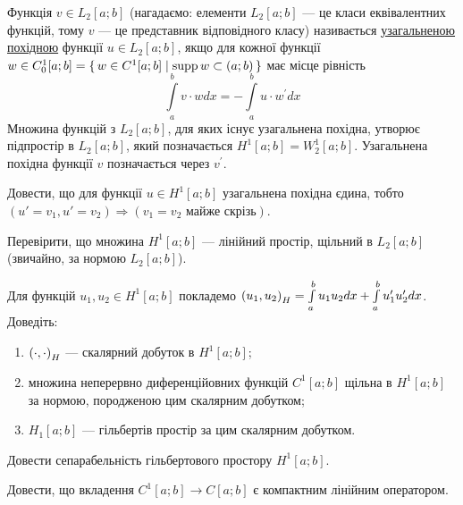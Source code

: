 
\begin{theory}
    Функція $v \in L_2[a;b]$ (нагадаємо: елементи
    $L_2[a;b]$ --- це класи еквівалентних функцій, тому
    $v$ --- це представник відповідного класу) називається
    \uline{узагальненою похідною} функції $u \in L_2[a;b]$,
    якщо для кожної функції $w \in C_0^1 [a;b] = \set{w \in C^1[a;b] \mid \operatorname{supp}{w} \subset (a; b)}$
    має місце рівність $$\int\limits_a^b v \cdot w dx = -\int\limits_a^b u \cdot w^\prime dx$$
    Множина функцій з $L_2[a;b]$, для яких існує узагальнена похідна, утворює
    підпростір в $L_2[a;b]$, який позначається $H^1[a;b] = W_2^1[a;b]$.
    Узагальнена похідна функції $v$ позначається через $v^\prime$.
\end{theory}

\begin{exercise}
    Довести, що для функції $u \in H^1[a;b]$ узагальнена похідна єдина,
    тобто $(u' = v_1, u' = v_2) \Rightarrow (v_1 = v_2 \text{ майже скрізь})$.
\end{exercise}

\begin{exercise}
    Перевірити, що множина $H^1[a;b]$ --- лінійний простір, щільний в $L_2[a;b]$ (звичайно, за нормою $L_2[a;b]$).
\end{exercise}

\begin{exercise}
    Для функцій $u_1, u_2 \in H^1[a;b]$ покладемо
    $\left(u_1, u_2\right)_H = \int\limits_a^b u_1 u_2 dx +\int\limits_a^b u_1^{\prime} u_2^{\prime} dx$.
    Доведіть:
    \begin{enumerate}
        \item $\left(\cdot, \cdot\right)_H$ --- скалярний добуток в $H^1[a;b]$;
        \item множина неперервно диференційовних функцій $C^1[a;b]$ щільна в $H^1[a;b]$ за нормою, породженою цим скалярним добутком;
        \item $H_1[a;b]$ --- гільбертів простір за цим скалярним добутком.
    \end{enumerate}
\end{exercise}

\begin{exercise}\label{N:3_1_4}
    Довести сепарабельність гільбертового простору $H^1[a;b]$.
\end{exercise}

\begin{exercise}
    Довести, що вкладення $C^1[a;b] \to C[a;b]$ є компактним лінійним оператором.
\end{exercise}

